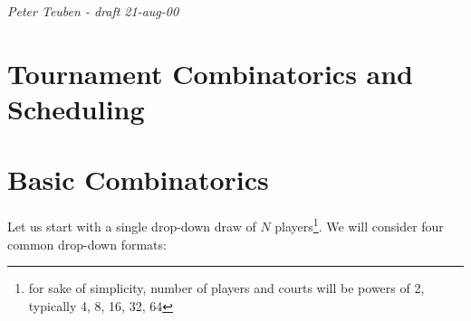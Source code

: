 

\setlength{\parindent}{0pt}
\setlength{\parskip}{2.5mm}






\begin{center}
{\it Peter Teuben - draft 21-aug-00}
\end{center}

\section*{Tournament Combinatorics and Scheduling}



\section*{Basic Combinatorics}

Let us start with a single drop-down draw of $N$ 
players\footnote{for sake of simplicity, number of players and
courts will be  powers of 2, typically 4, 8, 16, 32, 64}. 
We will consider four common drop-down formats:

